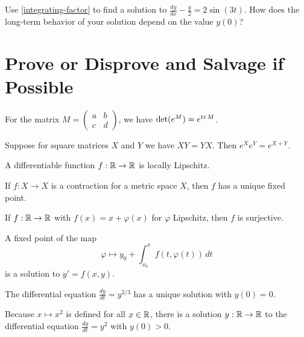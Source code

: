 \documentclass{homework}
\begin{document}
\begin{problem}Use \ref{integrating-factor} to find a solution to
  \(
    \displaystyle\frac{dy}{dx} - \displaystyle\frac{y}{2} = 2 \sin (3t).
  \)
  How does the long-term behavior of your solution depend on the value $y(0)$?
\end{problem}


\section{Prove or Disprove and Salvage if Possible}

\begin{problem}\label{two-by-two-jacobi-identity}For the matrix $M = \begin{pmatrix} a & b \\ c & d \end{pmatrix}$, we have
    $\det (e^M) = e^{\operatorname{tr} M}$.
\end{problem}

\begin{problem}\label{exp-commuting-matrices}Suppose for square matrices $X$ and $Y$ we have $XY = YX$.  Then $e^X e^Y = e^{X+Y}$.
\end{problem}

\begin{problem}
  A differentiable function $f : \mathbb{R} \to \mathbb{R}$ is locally Lipschitz.
\end{problem}

\begin{problem}
  If $f : X \to X$ is a contraction for a metric space $X$, then
  $f$ has a unique fixed point.
\end{problem}

\begin{problem}
  If $f : \mathbb{R} \to \mathbb{R}$ with $f(x) = x + \varphi(x)$ for $\varphi$ Lipschitz, then $f$ is surjective.
\end{problem}

\begin{problem}
  A fixed point of the map
  \[
    \varphi \mapsto y_0 + \int_{x_0}^x f(t,\varphi(t)) \, dt
  \]
  is a solution to $y' = f(x,y)$.
\end{problem}

\begin{problem}
  The differential equation $\displaystyle\frac{dy}{dt} = y^{2/3}$ has a unique solution with $y(0) = 0$.
\end{problem}

\begin{problem}
  Because $x \mapsto x^2$ is defined for all $x \in \mathbb{R}$, there is a solution $y : \mathbb{R} \to \mathbb{R}$ to the differential equation $\displaystyle\frac{dy}{dt} = y^2$ with $y(0) > 0$.
\end{problem}
\end{document}
